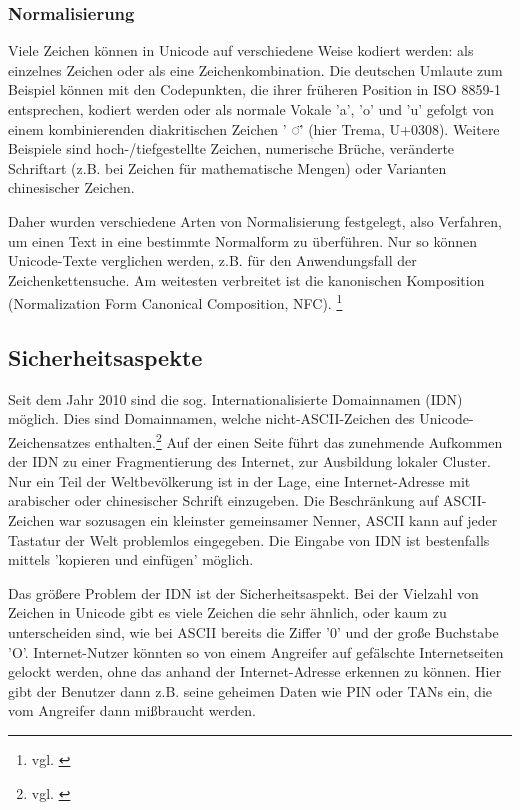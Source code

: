\subsubsection{Normalisierung}
Viele Zeichen können in Unicode auf verschiedene Weise kodiert werden: als einzelnes Zeichen oder als eine Zeichenkombination. Die deutschen Umlaute zum Beispiel können mit den Codepunkten, die ihrer früheren Position in ISO 8859-1 entsprechen, kodiert werden oder als normale Vokale 'a', 'o' und 'u' gefolgt von einem kombinierenden diakritischen Zeichen ' ◌̈' (hier Trema, U+0308). Weitere Beispiele sind hoch-/tiefgestellte Zeichen, numerische Brüche, veränderte Schriftart (z.B. bei Zeichen für mathematische Mengen) oder Varianten chinesischer Zeichen.

Daher wurden verschiedene Arten von Normalisierung festgelegt, also Verfahren, um einen Text in eine bestimmte Normalform zu überführen. Nur so können Unicode-Texte verglichen werden, z.B. für den Anwendungsfall der Zeichenkettensuche. Am weitesten verbreitet ist die kanonischen Komposition (Normalization Form Canonical Composition, NFC). \footnote{vgl. \cite{UC2014F}}

\subsection{Sicherheitsaspekte}
Seit dem Jahr 2010 sind die sog. Internationalisierte Domainnamen (IDN) möglich. 
Dies sind Domainnamen, welche nicht-ASCII-Zeichen des Unicode-Zeichensatzes enthalten.\footnote{vgl. \cite{IETF2010}}
Auf der einen Seite führt das zunehmende Aufkommen der IDN zu einer Fragmentierung des Internet, zur Ausbildung lokaler Cluster. Nur ein Teil der Weltbevölkerung ist in der Lage, eine Internet-Adresse mit arabischer oder chinesischer Schrift einzugeben. Die Beschränkung auf ASCII-Zeichen war sozusagen ein kleinster gemeinsamer Nenner, ASCII kann auf jeder Tastatur der Welt problemlos eingegeben. Die Eingabe von IDN ist bestenfalls mittels 'kopieren und einfügen' möglich. 

Das größere Problem der IDN ist der Sicherheitsaspekt. Bei der Vielzahl von Zeichen in Unicode gibt es viele Zeichen die sehr ähnlich, oder kaum zu unterscheiden sind, wie bei ASCII bereits die Ziffer '0' und der große Buchstabe 'O'. Internet-Nutzer könnten so von einem Angreifer auf gefälschte Internetseiten gelockt werden, ohne das anhand der Internet-Adresse erkennen zu können. Hier gibt der Benutzer dann z.B. seine geheimen Daten wie PIN oder TANs ein, die vom Angreifer dann mißbraucht werden.

